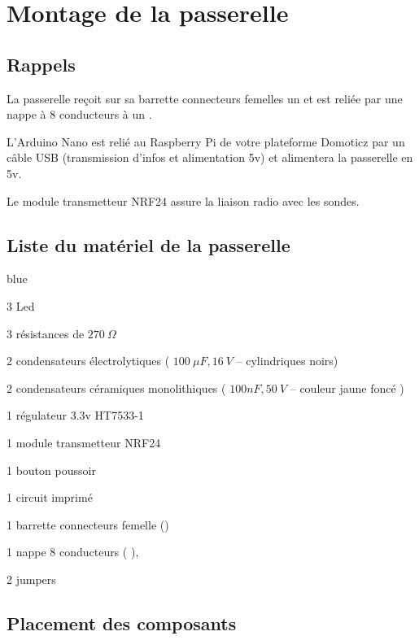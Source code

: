 \chapter{Montage de la passerelle}

\section{Rappels}

La passerelle reçoit sur sa barrette connecteurs femelles un  et est reliée par une nappe à 8 conducteurs à un .

L'Arduino Nano est relié au Raspberry Pi de votre plateforme Domoticz par un câble USB (transmission d'infos et alimentation 5v) et alimentera la passerelle en 5v.

Le module transmetteur NRF24 assure la liaison radio avec les sondes. 

\section{Liste du matériel de la passerelle}

\begin{items}{blue}{\Triangle}
    \item 3 Led
    \item 3 résistances de $270~\Omega$
    \item 2 condensateurs électrolytiques ( $100~\mu F, 16~V$ – cylindriques noirs)
    \item 2 condensateurs céramiques monolithiques ( $100nF, 50~V$ – couleur jaune foncé )
    \item 1 régulateur 3.3v HT7533-1
    \item 1 module transmetteur NRF24
    \item 1 bouton poussoir
    \item 1 circuit imprimé
    \item 1 barrette connecteurs femelle ()
    \item 1 nappe 8 conducteurs ( ),
    \item 2 jumpers
\end{items}

\section{Placement des composants}

